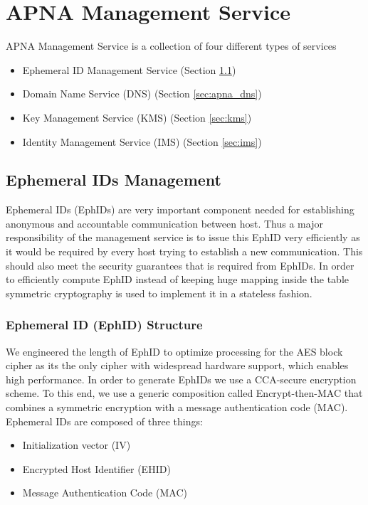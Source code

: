 
\chapter{APNA Management Service} %

\label{apnams} %

APNA Management Service is a collection of four different types of services

\begin{itemize}
    \item Ephemeral ID Management Service (Section \ref{sec:apna_ms})
    \item Domain Name Service (DNS) (Section \ref{sec:apna_dns})
    \item Key Management Service (KMS) (Section \ref{sec:kms})
    \item Identity Management Service (IMS) (Section \ref{sec:ims})
\end{itemize}

\section{Ephemeral IDs Management} \label{sec:apna_ms}
Ephemeral IDs (EphIDs) are very important component needed for establishing anonymous and accountable communication between host. Thus a major responsibility of the management service is to issue this EphID very efficiently as it would be required by every host trying to establish a new communication. This should also meet the security guarantees that is required from EphIDs. In order to efficiently compute EphID instead of keeping huge mapping inside the table symmetric cryptography is used to implement it in a stateless fashion.

\subsection{Ephemeral ID (EphID) Structure}
We engineered the length of EphID to optimize processing for the AES block cipher \cite{rfc3602} as its the only cipher with widespread hardware support, which enables high performance. In order to generate EphIDs we use a CCA-secure encryption scheme. To this end, we use a generic composition called Encrypt-then-MAC that combines a symmetric encryption with a message authentication code (MAC).
Ephemeral IDs are composed of three things:
\begin{itemize}
    \item Initialization vector (IV)
    \item Encrypted Host Identifier (EHID)
    \item Message Authentication Code (MAC)
\end{itemize}

